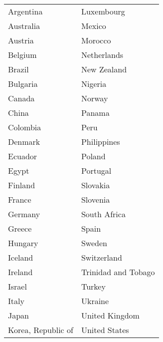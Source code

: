 {\tiny
\begin{tabular}{ll}
  \hline
  \hline
Argentina & Luxembourg \\ 
  Australia & Mexico \\ 
  Austria & Morocco \\ 
  Belgium & Netherlands \\ 
  Brazil & New Zealand \\ 
  Bulgaria & Nigeria \\ 
  Canada & Norway \\ 
  China & Panama \\ 
  Colombia & Peru \\ 
  Denmark & Philippines \\ 
  Ecuador & Poland \\ 
  Egypt & Portugal \\ 
  Finland & Slovakia \\ 
  France & Slovenia \\ 
  Germany & South Africa \\ 
  Greece & Spain \\ 
  Hungary & Sweden \\ 
  Iceland & Switzerland \\ 
  Ireland & Trinidad and Tobago \\ 
  Israel & Turkey \\ 
  Italy & Ukraine \\ 
  Japan & United Kingdom \\ 
  Korea, Republic of & United States \\ 
   \hline
\end{tabular}
}
